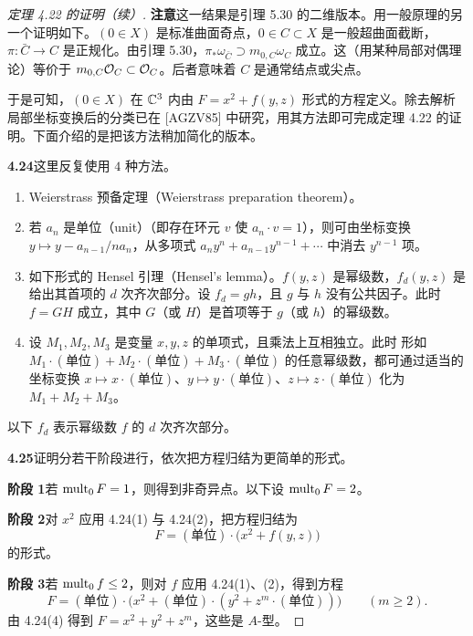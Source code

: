 \begin{proof}[定理 4.22 的证明（续）]
\par\medskip\noindent\textbf{注意}\quad 这一结果是引理 5.30 的二维版本。用一般原理的另一个证明如下。$(0\in X)$ 是标准曲面奇点，$0\in C\subset X$ 是一般超曲面截断，$\pi\colon\bar C\to C$ 是正规化。由引理 5.30，$\pi_*\omega_{\bar C}\supset m_{0,C}\omega_C$ 成立。这（用某种局部对偶理论）等价于 $m_{0,C}\mathcal{O}_C\subset\mathcal{O}_C$。后者意味着 $C$ 是通常结点或尖点。

于是可知，$(0\in X)$ 在 $\mathbb{C}^3$ 内由 $F=x^2+f(y,z)$ 形式的方程定义。除去解析局部坐标变换后的分类已在 [AGZV85] 中研究，用其方法即可完成定理 4.22 的证明。下面介绍的是把该方法稍加简化的版本。

\par\medskip\noindent\textbf{4.24}\quad 这里反复使用 $4$ 种方法。
\begin{enumerate}[label=(\arabic*),leftmargin=*]
\item Weierstrass 预备定理（Weierstrass preparation theorem）。
\item 若 $a_n$ 是单位（unit）（即存在环元 $v$ 使 $a_n\cdot v=1$），则可由坐标变换 $y\mapsto y-a_{n-1}/na_n$，从多项式 $a_ny^n+a_{n-1}y^{n-1}+\cdots$ 中消去 $y^{n-1}$ 项。
\item 如下形式的 Hensel 引理（Hensel's lemma）。$f(y,z)$ 是幂级数，$f_d(y,z)$ 是给出其首项的 $d$ 次齐次部分。设 $f_d=gh$，且 $g$ 与 $h$ 没有公共因子。此时 $f=GH$ 成立，其中 $G$（或 $H$）是首项等于 $g$（或 $h$）的幂级数。
\item 设 $M_1,M_2,M_3$ 是变量 $x,y,z$ 的单项式，且乘法上互相独立。此时
形如 $M_1\cdot(\text{单位})+M_2\cdot(\text{单位})+M_3\cdot(\text{单位})$ 的任意幂级数，都可通过适当的坐标变换 $x\mapsto x\cdot(\text{单位})$、$y\mapsto y\cdot(\text{单位})$、$z\mapsto z\cdot(\text{单位})$ 化为 $M_1+M_2+M_3$。
\end{enumerate}

以下 $f_d$ 表示幂级数 $f$ 的 $d$ 次齐次部分。

\par\medskip\noindent\textbf{4.25}\quad 证明分若干阶段进行，依次把方程归结为更简单的形式。

\noindent\textbf{阶段 1}\quad 若 $\operatorname{mult}_0F=1$，则得到非奇异点。以下设 $\operatorname{mult}_0F=2$。

\noindent\textbf{阶段 2}\quad 对 $x^2$ 应用 4.24(1) 与 4.24(2)，把方程归结为
\[
F=(\text{单位})\cdot\bigl(x^2+f(y,z)\bigr)
\]
的形式。

\noindent\textbf{阶段 3}\quad 若 $\operatorname{mult}_0f\le 2$，则对 $f$ 应用 4.24(1)、(2)，得到方程
\[
F=(\text{单位})\cdot\bigl(x^2+(\text{单位})\cdot(y^2+z^m\cdot(\text{单位}))\bigr)\qquad(m\ge 2).
\]
由 4.24(4) 得到 $F=x^2+y^2+z^m$，这些是 $A$-型。


\end{proof}
